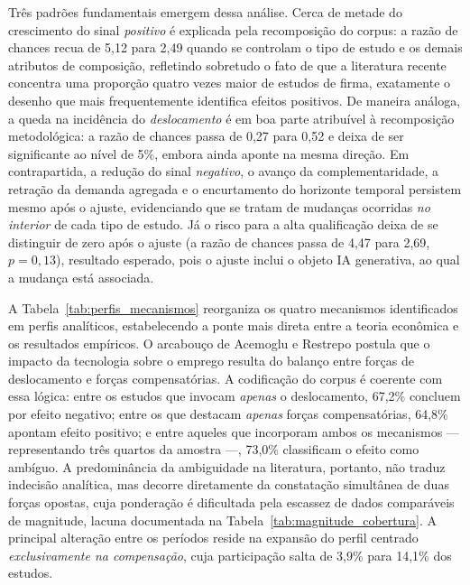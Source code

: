 Três padrões fundamentais emergem dessa análise. Cerca de metade do crescimento do sinal \emph{positivo} é explicada pela recomposição do corpus: a razão de chances recua de 5,12 para 2,49 quando se controlam o tipo de estudo e os demais atributos de composição, refletindo sobretudo o fato de que a literatura recente concentra uma proporção quatro vezes maior de estudos de firma, exatamente o desenho que mais frequentemente identifica efeitos positivos. De maneira análoga, a queda na incidência do \emph{deslocamento} é em boa parte atribuível à recomposição metodológica: a razão de chances passa de 0,27 para 0,52 e deixa de ser significante ao nível de 5\%, embora ainda aponte na mesma direção. Em contrapartida, a redução do sinal \emph{negativo}, o avanço da complementaridade, a retração da demanda agregada e o encurtamento do horizonte temporal persistem mesmo após o ajuste, evidenciando que se tratam de mudanças ocorridas \emph{no interior} de cada tipo de estudo. Já o risco para a alta qualificação deixa de se distinguir de zero após o ajuste (a razão de chances passa de 4,47 para 2,69, $p = 0{,}13$), resultado esperado, pois o ajuste inclui o objeto IA generativa, ao qual a mudança está associada.

\begin{table}[htbp]
\centering
\caption{Perfis de mecanismos: participação por período e sinal associado.}
\label{tab:perfis_mecanismos}

\end{table}


A Tabela~\ref{tab:perfis_mecanismos} reorganiza os quatro mecanismos identificados em perfis analíticos, estabelecendo a ponte mais direta entre a teoria econômica e os resultados empíricos. O arcabouço de Acemoglu e Restrepo postula que o impacto da tecnologia sobre o emprego resulta do balanço entre forças de deslocamento e forças compensatórias. A codificação do corpus é coerente com essa lógica: entre os estudos que invocam \emph{apenas} o deslocamento, 67,2\% concluem por efeito negativo; entre os que destacam \emph{apenas} forças compensatórias, 64,8\% apontam efeito positivo; e entre aqueles que incorporam ambos os mecanismos --- representando três quartos da amostra ---, 73,0\% classificam o efeito como ambíguo. A predominância da ambiguidade na literatura, portanto, não traduz indecisão analítica, mas decorre diretamente da constatação simultânea de duas forças opostas, cuja ponderação é dificultada pela escassez de dados comparáveis de magnitude, lacuna documentada na Tabela~\ref{tab:magnitude_cobertura}. A principal alteração entre os períodos reside na expansão do perfil centrado \emph{exclusivamente na compensação}, cuja participação salta de 3,9\% para 14,1\% dos estudos.

